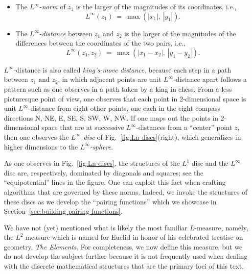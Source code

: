  
\begin{itemize}
\item
The $L^\infty$-{\it norm}  of $z_1$ is
the larger of the magnitudes of its coordinates, i.e.,
\[ L^\infty(z_1) \ = \ \max(|x_1|, \ |y_1|).  \]  

\item
The $L^\infty$-{\it distance} 
between $z_1$ and $z_2$ is the larger of the magnitudes of the
differences between the coordinates of the two pairs, i.e.,
\[ L^\infty(z_1, z_2) \ = \ \max(|x_1 - x_2|, \  |y_1 - y_2|). \]
\end{itemize}
$L^\infty$-distance is also called {\it king's-move distance},
 because each step in a path between $z_1$
and $z_2$, in which adjacent points are unit $L^\infty$-distance apart
follows a pattern such as one observes in a path taken by a king in
chess.  From a less picturesque point of view, one observes that each
point in $2$-dimensional space is unit $L^\infty$-distance from eight
other points, one each in the eight compass directions N, NE, E, SE,
S, SW, W, NW.  If one maps out the points in $2$-dimensional space
that are at successive $L^\infty$-distances from a ``center'' point
$z$, then one observes the {\it $L^\infty$-disc} of
Fig.~\ref{fig:Ln-discs}(right),  which
generalizes in higher dimensions to the
{\it $L^\infty$-sphere}. 

\smallskip

As one observes in Fig.~\ref{fig:Ln-discs}, the structures of the
$L^1$-disc and the $L^\infty$-disc are, respectively, dominated by
diagonals and squares; see the ``equipotential'' lines in the figure.
One can exploit this fact when crafting algorithms that are governed
by these norms.  Indeed, we invoke the structures of these discs as we
develop the ``pairing functions'' which we showcase in
Section~\ref{sec:building-pairing-functions}.

\bigskip

We have not (yet) mentioned what is likely the most familiar
$L$-measure, namely, the $L^2$ measure which is named for Euclid in
honor of his celebrated treatise on geometry, {\it The Elements}.
 For completeness, we now define this
measure, but we do not develop the subject further because it is not
frequently used when dealing with the discrete mathematical structures
that are the primary foci of this text.

